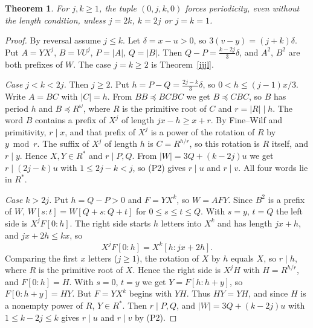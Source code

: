 \documentclass[10pt]{article}
\newtheorem{theorem}{Theorem}
\theoremstyle{remark}\newtheorem*{remark}{Remark}
\begin{document}
\begin{theorem}\label{0jk0}
For \(j,k\ge1\), the tuple \((0,j,k,0)\) forces periodicity, even without the length condition, unless \(j=2k\), \(k=2j\) or \(j=k=1\).
\end{theorem}
\begin{proof}
By reversal assume \(j\le k\). Let \(\delta=x-u>0\), so \(3(v-y)=(j+k)\delta\). Put \(A=YX^j\), \(B=VU^j\), \(P=|A|\), \(Q=|B|\). Then \(Q-P=\tfrac{k-2j}{3}\delta\), and \(A^2\), \(B^2\) are both prefixes of \(W\). The case \(j=k\ge2\) is Theorem~\ref{ijjl}.

\emph{Case \(j<k<2j\).} Then \(j\ge2\). Put \(h=P-Q=\tfrac{2j-k}{3}\delta\), so \(0<h\le(j-1)x/3\). Write \(A=BC\) with \(|C|=h\). From \(BB\preceq BCBC\) we get \(B\preceq CBC\), so \(B\) has period \(h\) and \(B\preceq R^\omega\), where \(R\) is the primitive root of \(C\) and \(r=|R|\mid h\). The word \(B\) contains a prefix of \(X^j\) of length \(jx-h\ge x+r\). By Fine--Wilf and primitivity, \(r\mid x\), and that prefix of \(X^j\) is a power of the rotation of \(R\) by \(y\bmod r\). The suffix of \(X^j\) of length \(h\) is \(C=R^{h/r}\), so this rotation is \(R\) itself, and \(r\mid y\). Hence \(X,Y\in R^*\) and \(r\mid P,Q\). From \(|W|=3Q+(k-2j)u\) we get \(r\mid(2j-k)u\) with \(1\le 2j-k<j\), so (P2) gives \(r\mid u\) and \(r\mid v\). All four words lie in \(R^*\).

\emph{Case \(k>2j\).} Put \(h=Q-P>0\) and \(F=YX^k\), so \(W=AFY\). Since \(B^2\) is a prefix of \(W\), \(W[s:t]=W[Q+s:Q+t]\) for \(0\le s\le t\le Q\). With \(s=y\), \(t=Q\) the left side is \(X^jF[0:h]\). The right side starts \(h\) letters into \(X^k\) and has length \(jx+h\), and \(jx+2h\le kx\), so
\[X^jF[0:h]=X^k[h:jx+2h].\]
Comparing the first \(x\) letters (\(j\ge1\)), the rotation of \(X\) by \(h\) equals \(X\), so \(r\mid h\), where \(R\) is the primitive root of \(X\). Hence the right side is \(X^jH\) with \(H=R^{h/r}\), and \(F[0:h]=H\). With \(s=0\), \(t=y\) we get \(Y=F[h:h+y]\), so \(F[0:h+y]=HY\). But \(F=YX^k\) begins with \(YH\). Thus \(HY=YH\), and since \(H\) is a nonempty power of \(R\), \(Y\in R^*\). Then \(r\mid P,Q\), and \(|W|=3Q+(k-2j)u\) with \(1\le k-2j\le k\) gives \(r\mid u\) and \(r\mid v\) by (P2).
\end{proof}
\end{document}
